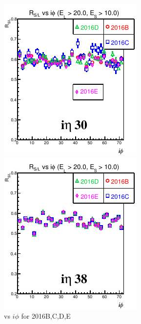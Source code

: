 \begin{figure}[!h] %
\begin{minipage}[c]{0.5\linewidth}
\centering
\includegraphics[width=0.7\linewidth]{../Figures/Chap2/ImageFiles_HF/Ratio/2016/ieta30For2016BtoE.pdf}
\end{minipage}
\begin{minipage}[c]{0.5\linewidth}
\centering
\includegraphics[width=0.7\linewidth]{../Figures/Chap2/ImageFiles_HF/Ratio/2016/ieta38For2016BtoE.pdf}
\end{minipage}
\caption{\ratiosl vs $i\phi$ for 2016B,C,D,E}
\label{RvsIphiFor2016BtoE}
\end{figure}

